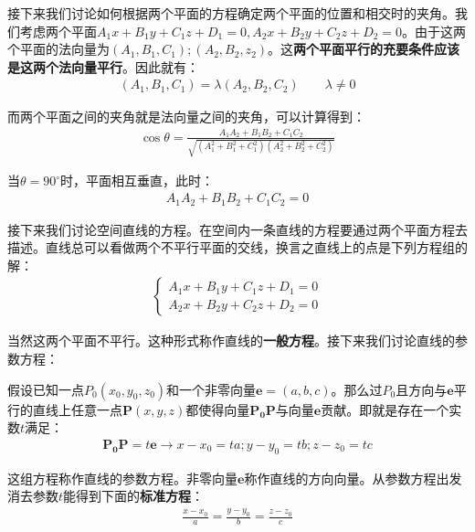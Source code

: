 \documentclass{ctexart}
\let\oldtextbf\textbf %
\renewcommand{\textbf}[1]{\textcolor{btex}{\oldtextbf{#1}}} %
\begin{document}
接下来我们讨论如何根据两个平面的方程确定两个平面的位置和相交时的夹角。我们考虑两个平面$A_1x+B_1y+C_1z+D_1=0,A_2x+B_2y+C_2z+D_2=0$。由于这两个平面的法向量为$(A_1,B_1,C_1);(A_2,B_2,z_2)$。这\textbf{两个平面平行的充要条件应该是这两个法向量平行}。因此就有：
\begin{align*}
    (A_1,B_1,C_1)=\lambda(A_2,B_2,C_2)\qquad \lambda\neq 0\tag{6-12}
\end{align*}

而两个平面之间的夹角就是法向量之间的夹角，可以计算得到：
\begin{align*}
    \cos\theta=\frac{A_1A_2+B_1B_2+C_1C_2}{\sqrt{(A_1^2+B_1^2+C_1^2)(A_2^2+B_2^2+C_2^2)}}
\end{align*}

当$\theta=90^\circ$时，平面相互垂直，此时：
\begin{align*}
    A_1A_2+B_1B_2+C_1C_2=0\tag{6-13}
\end{align*}

接下来我们讨论空间直线的方程。在空间内一条直线的方程要通过两个平面方程去描述。直线总可以看做两个不平行平面的交线，换言之直线上的点是下列方程组的解：
\begin{align*}
    \begin{cases}
        A_1x+B_1y+C_1z+D_1=0\\
        A_2x+B_2y+C_2z+D_2=0
    \end{cases}
\end{align*}

当然这两个平面不平行。这种形式称作直线的\textbf{一般方程}。接下来我们讨论直线的参数方程：

假设已知一点$P_0(x_0,y_0,z_0)$和一个非零向量$\bm{e}=(a,b,c)$。那么过$P_0$且方向与$\bm{e}$平行的直线上任意一点$\bm{P}(x,y,z)$都使得向量$\bm{P_0P}$与向量$\bm{e}$贡献。即就是存在一个实数$t$满足：
\begin{align*}
    \bm{P_0P}=t\bm{e}\to x-x_0=ta;y-y_0=tb;z-z_0=tc
\end{align*}

\begin{tcolorbox}[
    colback=bac1,     %
    colframe=fra1,   %
    coltitle=white,             %
    coltext=tex1,
    title=直线的参数方程,
    fonttitle=\bfseries,        %
arc=3mm,                     %
breakable
]
这组方程称作直线的参数方程。非零向量$\bm{e}$称作直线的方向向量。从参数方程出发消去参数$t$能得到下面的\textbf{标准方程}：
\begin{align*}
    \frac{x-x_0}{a}=\frac{y-y_0}{b}=\frac{z-z_0}{c}\tag{6-14}
\end{align*}
\end{tcolorbox}
\end{document}
